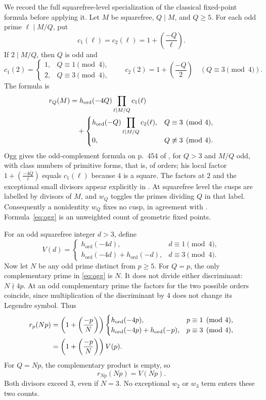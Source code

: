 \documentclass[11pt,a4paper]{article}
\theoremstyle{remark}\newtheorem{remark}[theorem]{Remark}
\numberwithin{equation}{section}
\newcommand{\leg}[2]{\left(\frac{#1}{#2}\right)}
\newcommand{\ho}{h_{\mathrm{ord}}}
\begin{document}
We record the full squarefree-level specialization of the classical fixed-point formula before applying it. Let $M$ be squarefree, $Q\mid M$, and $Q\geq5$. For each odd prime $\ell\mid M/Q$, put
\[
c_1(\ell)=c_2(\ell)=1+\leg{-Q}{\ell}.
\]
If $2\mid M/Q$, then $Q$ is odd and
\[
c_1(2)=\begin{cases}1,&Q\equiv1\pmod4,\\2,&Q\equiv3\pmod4,\end{cases}
\qquad c_2(2)=1+\leg{-Q}{2}\quad(Q\equiv3\pmod4).
\]
The formula is
\begin{align}
r_Q(M)&=\ho(-4Q)\prod_{\ell\mid M/Q}c_1(\ell)\notag\\
&\quad+\begin{cases}
\ho(-Q)\displaystyle\prod_{\ell\mid M/Q}c_2(\ell),&Q\equiv3\pmod4,\\
0,&Q\not\equiv3\pmod4.
\end{cases}\label{eq:ogg}
\end{align}
Ogg gives the odd-complement formula on p.~454 of \cite{Ogg}, for $Q>3$ and $M/Q$ odd, with class numbers of primitive forms, that is, of orders; his local factor $1+\leg{-4Q}{\ell}$ equals $c_1(\ell)$ because $4$ is a square. The factors at $2$ and the exceptional small divisors appear explicitly in \cite[Proposition 2.1]{IJK}. At squarefree level the cusps are labelled by divisors of $M$, and $w_Q$ toggles the primes dividing $Q$ in that label. Consequently a nonidentity $w_Q$ fixes no cusp, in agreement with \cite[Proposition 3]{Ogg}. Formula~\eqref{eq:ogg} is an unweighted count of geometric fixed points.

For an odd squarefree integer $d>3$, define
\[
V(d)=\begin{cases}
\ho(-4d),&d\equiv1\pmod4,\\
\ho(-4d)+\ho(-d),&d\equiv3\pmod4.
\end{cases}
\]
Now let $N$ be any odd prime distinct from $p\geq5$. For $Q=p$, the only complementary prime in \eqref{eq:ogg} is $N$. It does not divide either discriminant: $N\nmid4p$. At an odd complementary prime the factors for the two possible orders coincide, since multiplication of the discriminant by $4$ does not change its Legendre symbol. Thus
\begin{align}
r_p(Np)
&=\left(1+\leg{-p}{N}\right)
\begin{cases}\ho(-4p),&p\equiv1\pmod4,\\
\ho(-4p)+\ho(-p),&p\equiv3\pmod4,\end{cases}\notag\\
&=\left(1+\leg{-p}{N}\right)V(p).\label{eq:rp}
\end{align}
For $Q=Np$, the complementary product is empty, so
\begin{equation}\label{eq:rnp}
r_{Np}(Np)=V(Np).
\end{equation}
Both divisors exceed $3$, even if $N=3$. No exceptional $w_2$ or $w_3$ term enters these two counts.
\end{document}
